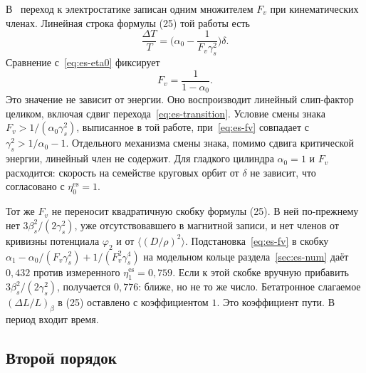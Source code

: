 В~\cite{Senichev2013} переход к электростатике записан одним множителем $F_v$ при кинематических членах. Линейная строка формулы (25) той работы есть
\begin{equation}
\label{eq:es-sen25}
\frac{\Delta T}{T}
=\Biggl(\alpha_0-\frac{1}{F_v\gamma_s^2}\Biggr)\delta.
\end{equation}
Сравнение с~\eqref{eq:es-eta0} фиксирует
\begin{equation}
\label{eq:es-fv}
F_v=\frac{1}{1-\alpha_0}.
\end{equation}
Это значение не зависит от энергии. Оно воспроизводит линейный слип-фактор целиком, включая сдвиг перехода~\eqref{eq:es-transition}. Условие смены знака $F_v>1/(\alpha_0\gamma_s^2)$, выписанное в той работе, при~\eqref{eq:es-fv} совпадает с $\gamma_s^2>1/\alpha_0-1$. Отдельного механизма смены знака, помимо сдвига критической энергии, линейный член не содержит. Для гладкого цилиндра $\alpha_0=1$ и $F_v$ расходится: скорость на семействе круговых орбит от $\delta$ не зависит, что согласовано с $\eta_0^{\mathrm{es}}=1$.

Тот же $F_v$ не переносит квадратичную скобку формулы (25). В ней по-прежнему нет $3\beta_s^2/(2\gamma_s^2)$, уже отсутствовавшего в магнитной записи, и нет членов от кривизны потенциала $\varphi_2$ и от $\langle(D/\rho)^2\rangle$. Подстановка~\eqref{eq:es-fv} в скобку $\alpha_1-\alpha_0/(F_v\gamma_s^2)+1/(F_v^2\gamma_s^4)$ на модельном кольце раздела~\ref{sec:es-num} даёт $0{,}432$ против измеренного $\eta_1^{\mathrm{es}}=0{,}759$. Если к этой скобке вручную прибавить $3\beta_s^2/(2\gamma_s^2)$, получается $0{,}776$: ближе, но не то же число. Бетатронное слагаемое $(\Delta L/L)_\beta$ в (25) оставлено с коэффициентом $1$. Это коэффициент пути. В период входит время.

\subsection{Второй порядок}
\label{sec:es-eta1}

